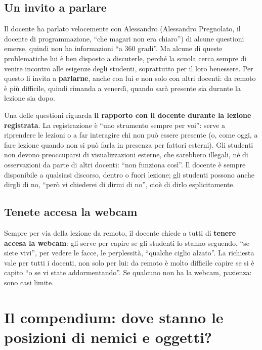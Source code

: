 \subsection{Un invito a parlare}

Il docente ha parlato velocemente con Alessandro (Alessandro Pregnolato, il
docente di programmazione, ``che magari non era chiaro'') di alcune
questioni emerse, quindi non ha informazioni ``a 360 gradi''. Ma alcune di
queste problematiche lui è ben disposto a discuterle, perché la scuola cerca
sempre di venire incontro alle esigenze degli studenti, soprattutto per il
loro benessere. Per questo li invita a \textbf{parlarne}, anche con lui e
non solo con altri docenti: da remoto è più difficile, quindi rimanda a
venerdì, quando sarà presente sia durante la lezione sia dopo.

Una delle questioni riguarda \textbf{il rapporto con il docente durante la
lezione registrata}. La registrazione è ``uno strumento sempre per voi'':
serve a riprendere le lezioni o a far interagire chi non può essere presente
(o, come oggi, a fare lezione quando non si può farla in presenza per
fattori esterni). Gli studenti non devono preoccuparsi di visualizzazioni
esterne, che sarebbero illegali, né di osservazioni da parte di altri
docenti: ``non funziona così''. Il docente è sempre disponibile a qualsiasi
discorso, dentro o fuori lezione; gli studenti possono anche dirgli di no,
``però vi chiederei di dirmi di no'', cioè di dirlo esplicitamente.

\subsection{Tenete accesa la webcam}

Sempre per via della lezione da remoto, il docente chiede a tutti di
\textbf{tenere accesa la webcam}: gli serve per capire se gli studenti lo
stanno seguendo, ``se siete vivi'', per vedere le facce, le perplessità,
``qualche ciglio alzato''. La richiesta vale per tutti i docenti, non solo
per lui: da remoto è molto difficile capire se si è capito ``o se vi state
addormentando''. Se qualcuno non ha la webcam, pazienza: sono casi limite.

\section{Il compendium: dove stanno le posizioni di nemici e oggetti?}
\label{gd15:sec:posizioni}

